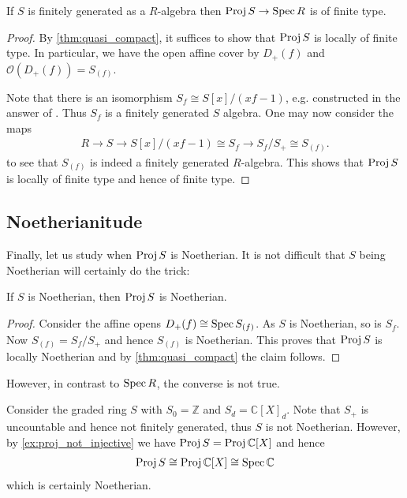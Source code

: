 \documentclass{article}
\begin{document}
\begin{lemma}\label{thm:finite_type}
  If $S$ is finitely generated as a $R$-algebra then
  $\operatorname{Proj} S\to\operatorname{Spec} R$ is of finite type.
  \begin{proof}
    By \ref{thm:quasi_compact}, it suffices to show that $\operatorname{Proj} S$
    is locally of finite type. In particular, we have the open affine
    cover by $D_+(f)$ and $\mathcal O(D_+(f)) = S_{(f)}$.

    Note that there is an isomorphism $S_f \cong S[x]/(xf - 1)$,
    e.g. constructed in the answer of \cite{hm2020}.
    Thus $S_f$ is a finitely generated $S$ algebra. One may
    now consider the maps
    \begin{align*}
      R\longrightarrow S
      \longrightarrow S[x]/(xf-1) \cong S_f
      \longrightarrow S_f/S_+ \cong S_{(f)}.
    \end{align*}
    to see that $S_{(f)}$ is indeed a finitely generated $R$-algebra.
    This shows that $\operatorname{Proj} S$ is locally of finite type and hence
    of finite type.
  \end{proof}
\end{lemma}


\subsection{Noetherianitude}

Finally, let us study when $\operatorname{Proj} S$ is Noetherian. It is not
difficult that $S$ being Noetherian will certainly do
the trick:

\begin{proposition}
  If $S$ is Noetherian, then $\operatorname{Proj} S$ is Noetherian.
  \begin{proof}
    Consider the affine opens $D_+(f)\cong\operatorname{Spec} S_{(f)}$.
    As $S$ is Noetherian, so is $S_f$. Now
    $S_{(f)} = S_f / S_+$ and hence $S_{(f)}$ is Noetherian.
    This proves that $\operatorname{Proj} S$ is locally Noetherian and
    by \ref{thm:quasi_compact} the claim follows.
  \end{proof}
\end{proposition}

However, in contrast to $\operatorname{Spec} R$, the converse is not true.

\begin{example}
  Consider the graded ring $S$ with $S_0 = \mathbb{Z}$
  and $S_d = \mathbb{C}[X]_d$. Note that $S_+$ is uncountable and
  hence not finitely generated, thus $S$ is not Noetherian.
  However, by \ref{ex:proj_not_injective} we have
  $\operatorname{Proj} S = \operatorname{Proj} \mathbb{C}[X]$ and hence
  \begin{align*}
    \operatorname{Proj} S \cong \operatorname{Proj} \mathbb{C}[X] \cong \operatorname{Spec} \mathbb{C}
  \end{align*}
  which is certainly Noetherian.
\end{example}
\end{document}
